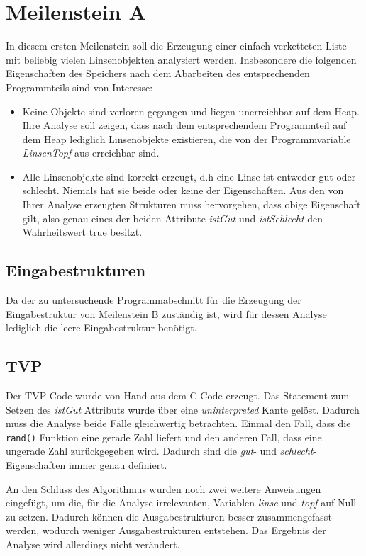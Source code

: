 \section{Meilenstein A}
In diesem ersten Meilenstein soll die Erzeugung einer einfach-verketteten Liste mit beliebig vielen Linsenobjekten analysiert werden. Insbesondere die folgenden Eigenschaften des Speichers nach dem Abarbeiten des entsprechenden Programmteils sind von Interesse:
\begin{itemize}
	\item Keine Objekte sind verloren gegangen und liegen unerreichbar auf dem Heap. Ihre Analyse soll zeigen, dass nach dem entsprechendem Programmteil auf dem Heap lediglich Linsenobjekte existieren, die von der Programmvariable \emph{LinsenTopf} aus erreichbar sind.
	\item Alle Linsenobjekte sind korrekt erzeugt, d.h eine Linse ist entweder gut oder schlecht. Niemals hat sie beide oder keine der Eigenschaften. Aus den von Ihrer Analyse erzeugten Strukturen muss hervorgehen, dass obige Eigenschaft gilt, also genau eines der beiden Attribute \emph{istGut} und \emph{istSchlecht} den Wahrheitswert true besitzt.
\end{itemize}


\subsection{Eingabestrukturen}
Da der zu untersuchende Programmabschnitt für die Erzeugung der Eingabestruktur von Meilenstein B zuständig ist, wird für dessen Analyse lediglich die leere Eingabestruktur benötigt. 


\subsection{TVP}
Der TVP-Code wurde von Hand aus dem C-Code erzeugt. Das Statement zum Setzen des \emph{istGut} Attributs wurde über eine \emph{uninterpreted} Kante gelöst. Dadurch muss die Analyse beide Fälle gleichwertig betrachten. Einmal den Fall, dass die \texttt{rand()} Funktion eine gerade Zahl liefert und den anderen Fall, dass eine ungerade Zahl zurückgegeben wird. Dadurch sind die \emph{gut}- und \emph{schlecht}-Eigenschaften immer genau definiert.

An den Schluss des Algorithmus wurden noch zwei weitere Anweisungen eingefügt, um die, für die Analyse irrelevanten, Variablen \emph{linse} und \emph{topf} auf Null zu setzen. Dadurch können die Ausgabestrukturen besser zusammengefasst werden, wodurch weniger Ausgabestrukturen entstehen. Das Ergebnis der Analyse wird allerdings nicht verändert.

